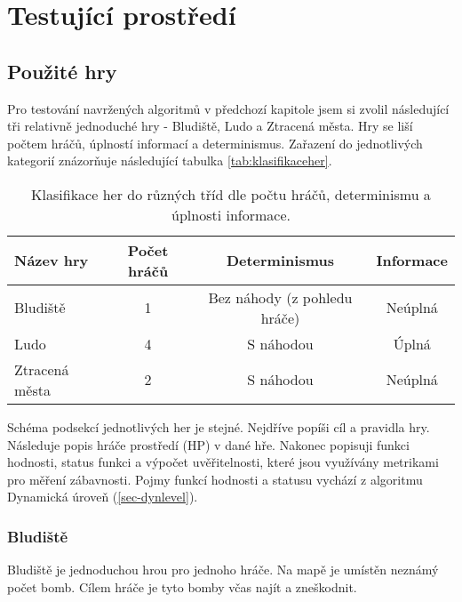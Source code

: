 \chapter{Testující prostředí}

\section{Použité hry}

Pro testování navržených algoritmů v předchozí kapitole jsem si zvolil následující tři relativně jednoduché hry - Bludiště, Ludo a Ztracená města. Hry se liší počtem hráčů, úplností informací a determinismus. Zařazení do jednotlivých kategorií znázorňuje následující tabulka \ref{tab:klasifikaceher}.

\begin{table*}[b]\footnotesize
\vspace*{0mm}
\caption{{\label{tab:klasifikaceher}} Klasifikace her do různých tříd dle počtu hráčů, determinismu a úplnosti informace. }
\vspace*{0mm}
\label{shadowtable}
\begin{center}
\begin{tabular}{| l || c | c | c |}
\hline
Název hry & Počet hráčů & Determinismus & Informace \\
\hline
\hline
Bludiště & 1 & Bez náhody (z pohledu hráče) & Neúplná \\ \hline
Ludo & 4 & S náhodou & Úplná \\ \hline
Ztracená města & 2 & S náhodou & Neúplná \\ \hline
\end{tabular}
\end{center}
\end{table*}

Schéma podsekcí jednotlivých her je stejné. Nejdříve popíši cíl a pravidla hry. Následuje popis hráče prostředí (HP) v dané hře. Nakonec popisuji funkci hodnosti, status funkci a výpočet uvěřitelnosti, které jsou využívány metrikami pro měření zábavnosti. Pojmy funkcí hodnosti a statusu vychází z algoritmu Dynamická úroveň (\ref{sec-dynlevel}).

\subsection{Bludiště}

Bludiště je jednoduchou hrou pro jednoho hráče. Na mapě je umístěn neznámý počet bomb. Cílem hráče je tyto bomby včas najít a zneškodnit.

